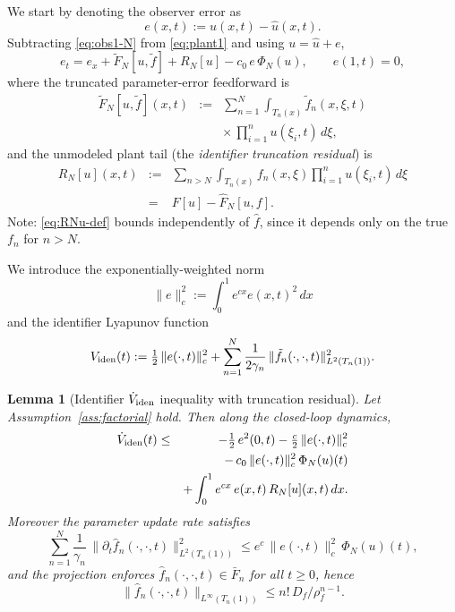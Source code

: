 \documentclass[journal,twoside,web]{ieeecolor}
\newtheorem{lemma}{Lemma}
\begin{document}
We start by denoting the observer error as
\begin{equation}\label{eq:e-def}
e(x,t):=u(x,t)-\hat u(x,t).
\end{equation}
Subtracting \eqref{eq:obs1-N} from \eqref{eq:plant1} and using $u=\hat u+e$,
\begin{equation}\label{eq:e-dynamics}
e_t=e_x+\tilde F_N[u,\tilde f]+R_N[u]-c_0\,e\,\Phi_N(u),\qquad e(1,t)=0,
\end{equation}
where the truncated parameter-error feedforward is
\begin{eqnarray}
\tilde F_N[u,\tilde f](x,t) &:=& \sum_{n=1}^N\int_{T_n(x)}\tilde f_n(x,\xi,t) \nonumber\\
&& \times\,\prod_{i=1}^n u(\xi_i,t)\,d\xi, \label{eq:Ftilde-N}
\end{eqnarray}
and the unmodeled plant tail (the \emph{identifier truncation residual}) is
\begin{eqnarray}
R_N[u](x,t) &:=& \sum_{n>N}\int_{T_n(x)}f_n(x,\xi)\prod_{i=1}^n u(\xi_i,t)\,d\xi \nonumber\\
&=& F[u]-\hat F_N[u,f]. \label{eq:RNu-def}
\end{eqnarray}
Note: \eqref{eq:RNu-def} bounds independently of $\hat f$, since it depends only on the true $f_n$ for $n>N$.

We introduce the exponentially-weighted norm 
\begin{equation}\label{eq:c-norm}
\|e\|_c^2:=\int_0^1 e^{cx}e(x,t)^2\,dx
\end{equation}
and the identifier Lyapunov function 
\begin{equation}\label{eq:V-N}
V_{\rm iden}(t):=\tfrac12\,\|e(\cdot,t)\|_c^2+\sum_{n=1}^N\frac{1}{2\gamma_n}\,\|\tilde f_n(\cdot,\cdot,t)\|^2_{L^2(T_n(1))}.
\end{equation}

\begin{lemma}[Identifier $\dot V_{\rm iden}$ inequality with truncation residual]\label{lem:Vdot-N}
Let Assumption~\ref{ass:factorial} hold. Then along the closed-loop dynamics,
\begin{eqnarray}
\dot V_{\rm iden}(t) &\le& -\tfrac12\,e^2(0,t)-\tfrac{c}{2}\,\|e(\cdot,t)\|_c^2 \nonumber\\
&& -\,c_0\,\|e(\cdot,t)\|_c^2\,\Phi_N(u)(t) \nonumber\\
&& +\int_0^1 e^{cx}\,e(x,t)\,R_N[u](x,t)\,dx. \label{eq:Vdot-N}
\end{eqnarray}
Moreover the parameter update rate satisfies
\begin{equation}\label{eq:P4-N}
\sum_{n=1}^N\frac{1}{\gamma_n}\,\|\partial_t\hat f_n(\cdot,\cdot,t)\|^2_{L^2(T_n(1))}\le e^c\,\|e(\cdot,t)\|_c^2\,\Phi_N(u)(t),
\end{equation}
and the projection enforces $\hat f_n(\cdot,\cdot,t)\in \bar F_n$ for all $t\ge 0$, hence
\begin{equation}\label{eq:P1-N}
\|\hat f_n(\cdot,\cdot,t)\|_{L^\infty(T_n(1))}\le n!\,D_f/\rho_f^{n-1}.
\end{equation}
\end{lemma}
\end{document}

